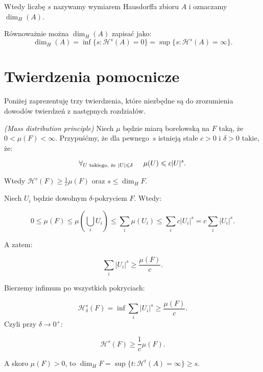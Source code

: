 \documentclass{mini}
\begin{document}
Wtedy liczbę $s$ nazywamy wymiarem Hausdorffa zbioru $A$ i oznaczamy $\dim_H(A)$.

Równoważnie można $\dim_H(A)$ zapisać jako:
$$
\dim_H(A)= \inf\lbrace s: \mathcal{H}^s(A)=0\rbrace=\sup\lbrace s: \mathcal{H}^s(A)=\infty\rbrace.
$$

\section{Twierdzenia pomocnicze}

Poniżej zaprezentuję trzy twierdzenia, które niezbędne są do zrozumienia dowodów twierdzeń z następnych rozdziałów.

\begin{tw}{\textit{(Mass distribution principle)}}\label{mass}
Niech $\mu$ będzie miarą borelowską na $F$ taką, że $0<\mu(F)<\infty$. Przypuśćmy, że dla pewnego~$s$ istnieją stałe $c>0$ i $\delta>0$ takie, że:

\begin{equation}
\forall_{U \hspace{1mm}\textrm{takiego, że} \hspace{1mm} |U|\leqslant \delta} \hspace{5mm} \mu (U) \leqslant c|U|^s.
\end{equation}   

Wtedy $\mathcal{H}^s(F)\geqslant \frac{1}{c} \mu (F)$ oraz $s \leqslant \dim_{H}F$.
\end{tw}


\begin{dow}

Niech $U_i$ będzie dowolnym $\delta$-pokryciem $F$. Wtedy:

$$0 \leq \mu (F) \leqslant \mu\left( \bigcup_i U_i \right) \leqslant \sum_i \mu (U_i) \leqslant \sum_i c|U_i|^s = c \sum_i |U_i|^s. $$

A zatem: 

$$ \sum_i |U_i|^s \geqslant \frac{\mu(F)}{c}. $$

Bierzemy infimum po wszystkich pokryciach:

$$
\mathcal{H}^s_{\delta}(F)= \inf \sum_i |U_i|^s \geqslant \frac{\mu(F)}{c}.
$$
\newpage
Czyli przy $ \delta \rightarrow 0^+ $:

$$ \mathcal{H}^s (F) \geqslant \frac{1}{c} \mu (F). $$

A skoro $ \mu(F)>0 $, to $\dim_HF=\sup\lbrace t: \mathcal{H}^t(A)=\infty\rbrace \geqslant s$. 

\end{dow}
\end{document}
